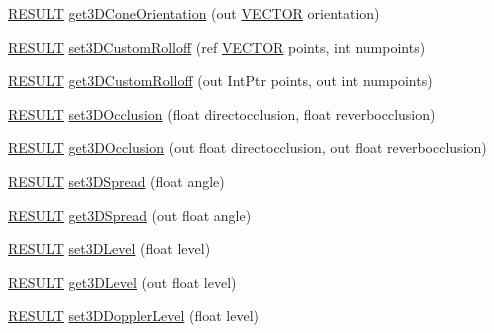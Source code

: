 \begin{DoxyCompactItemize}
\item 
\hyperlink{namespace_f_m_o_d_a305d1176ef3f8c8815861a60407ac33d}{R\+E\+S\+U\+LT} \hyperlink{class_f_m_o_d_1_1_channel_control_a521d587b391d3e3ea5e378ab026dd04a}{get3\+D\+Cone\+Orientation} (out \hyperlink{struct_f_m_o_d_1_1_v_e_c_t_o_r}{V\+E\+C\+T\+OR} orientation)
\item 
\hyperlink{namespace_f_m_o_d_a305d1176ef3f8c8815861a60407ac33d}{R\+E\+S\+U\+LT} \hyperlink{class_f_m_o_d_1_1_channel_control_a53e43de080eb44dc47c931f953ff3434}{set3\+D\+Custom\+Rolloff} (ref \hyperlink{struct_f_m_o_d_1_1_v_e_c_t_o_r}{V\+E\+C\+T\+OR} points, int numpoints)
\item 
\hyperlink{namespace_f_m_o_d_a305d1176ef3f8c8815861a60407ac33d}{R\+E\+S\+U\+LT} \hyperlink{class_f_m_o_d_1_1_channel_control_a76cbd7d34b6864e7490ad96571c07c10}{get3\+D\+Custom\+Rolloff} (out Int\+Ptr points, out int numpoints)
\item 
\hyperlink{namespace_f_m_o_d_a305d1176ef3f8c8815861a60407ac33d}{R\+E\+S\+U\+LT} \hyperlink{class_f_m_o_d_1_1_channel_control_a145c6282dcd74909a986ee9672b1c0ae}{set3\+D\+Occlusion} (float directocclusion, float reverbocclusion)
\item 
\hyperlink{namespace_f_m_o_d_a305d1176ef3f8c8815861a60407ac33d}{R\+E\+S\+U\+LT} \hyperlink{class_f_m_o_d_1_1_channel_control_a539d1c234e3714527859e706e35b57ee}{get3\+D\+Occlusion} (out float directocclusion, out float reverbocclusion)
\item 
\hyperlink{namespace_f_m_o_d_a305d1176ef3f8c8815861a60407ac33d}{R\+E\+S\+U\+LT} \hyperlink{class_f_m_o_d_1_1_channel_control_a0749e7b796de77fba97491dc4c857e82}{set3\+D\+Spread} (float angle)
\item 
\hyperlink{namespace_f_m_o_d_a305d1176ef3f8c8815861a60407ac33d}{R\+E\+S\+U\+LT} \hyperlink{class_f_m_o_d_1_1_channel_control_af8a352157fe729017d4162e8c19b81b0}{get3\+D\+Spread} (out float angle)
\item 
\hyperlink{namespace_f_m_o_d_a305d1176ef3f8c8815861a60407ac33d}{R\+E\+S\+U\+LT} \hyperlink{class_f_m_o_d_1_1_channel_control_a7bf8978225d291afde7f0e5e070365b1}{set3\+D\+Level} (float level)
\item 
\hyperlink{namespace_f_m_o_d_a305d1176ef3f8c8815861a60407ac33d}{R\+E\+S\+U\+LT} \hyperlink{class_f_m_o_d_1_1_channel_control_a3eb4bac48ce0d592313e7333fa853d21}{get3\+D\+Level} (out float level)
\item 
\hyperlink{namespace_f_m_o_d_a305d1176ef3f8c8815861a60407ac33d}{R\+E\+S\+U\+LT} \hyperlink{class_f_m_o_d_1_1_channel_control_ae3091e0dc2afff40176cee431d5c52ed}{set3\+D\+Doppler\+Level} (float level)

\end{DoxyCompactItemize}
